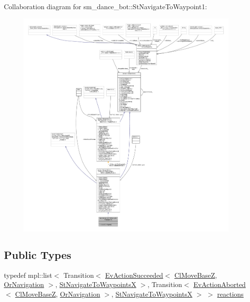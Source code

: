 Collaboration diagram for sm\+\_\+dance\+\_\+bot\+:\+:St\+Navigate\+To\+Waypoint1\+:
\nopagebreak
\begin{figure}[H]
\begin{center}
\leavevmode
\includegraphics[width=350pt]{structsm__dance__bot_1_1StNavigateToWaypoint1__coll__graph}
\end{center}
\end{figure}
\subsection*{Public Types}
\begin{DoxyCompactItemize}
\item 
typedef mpl\+::list$<$ Transition$<$ \hyperlink{structsmacc_1_1default__events_1_1EvActionSucceeded}{Ev\+Action\+Succeeded}$<$ \hyperlink{classcl__move__base__z_1_1ClMoveBaseZ}{Cl\+Move\+BaseZ}, \hyperlink{classsm__dance__bot_1_1OrNavigation}{Or\+Navigation} $>$, \hyperlink{structsm__dance__bot_1_1StNavigateToWaypointsX}{St\+Navigate\+To\+WaypointsX} $>$, Transition$<$ \hyperlink{structsmacc_1_1default__events_1_1EvActionAborted}{Ev\+Action\+Aborted}$<$ \hyperlink{classcl__move__base__z_1_1ClMoveBaseZ}{Cl\+Move\+BaseZ}, \hyperlink{classsm__dance__bot_1_1OrNavigation}{Or\+Navigation} $>$, \hyperlink{structsm__dance__bot_1_1StNavigateToWaypointsX}{St\+Navigate\+To\+WaypointsX} $>$ $>$ \hyperlink{structsm__dance__bot_1_1StNavigateToWaypoint1_a259ea139b570872152c7d09219555653}{reactions}
\end{DoxyCompactItemize}

